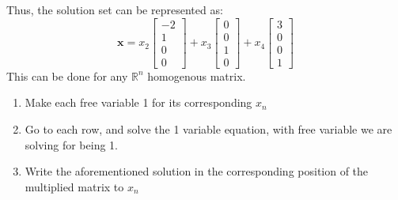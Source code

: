\documentclass[nobib]{tufte-handout}
\begin{document}
Thus, the solution set can be represented as:
\begin{equation*}
    \mathbf{x}=
    x_2
    \begin{bmatrix}
        -2 \\ 1 \\ 0 \\ 0
    \end{bmatrix} +x_3
    \begin{bmatrix}
        0 \\ 0 \\ 1 \\ 0
    \end{bmatrix} + x_4
    \begin{bmatrix}
        3 \\ 0 \\ 0 \\ 1
    \end{bmatrix}
\end{equation*}
This can be done for any $\mathbb{R}^n$ homogenous matrix.
\begin{enumerate}
    \item Make each free variable 1 for its corresponding $x_n$
    \item Go to each row, and solve the 1 variable equation, with free variable we are
          solving for being 1.
    \item Write the aforementioned solution in the corresponding position of the
          multiplied matrix to $x_n$
\end{enumerate}
\end{document}
